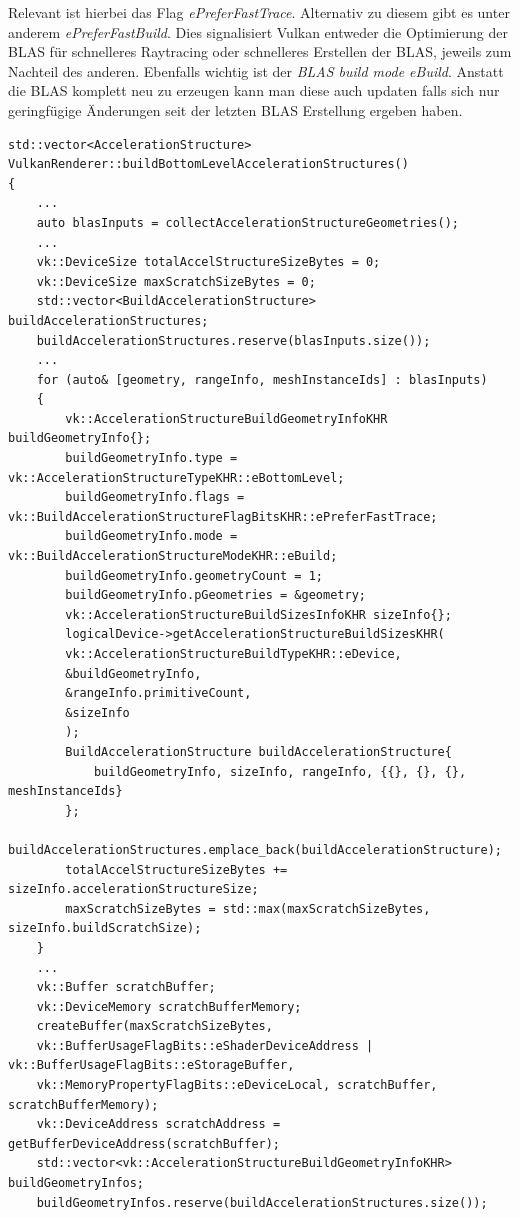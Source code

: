 \documentclass[11pt]{scrartcl}
\begin{document}
	Relevant ist hierbei das Flag \textit{ePreferFastTrace}. Alternativ zu diesem gibt es unter anderem \textit{ePreferFastBuild}. Dies signalisiert Vulkan entweder die Optimierung der BLAS für schnelleres Raytracing oder schnelleres Erstellen der BLAS, jeweils zum Nachteil des anderen. Ebenfalls wichtig ist der \textit{BLAS build mode eBuild}. Anstatt die BLAS komplett neu zu erzeugen kann man diese auch updaten falls sich nur geringfügige Änderungen seit der letzten BLAS Erstellung ergeben haben.
	
	\begin{lstlisting}[caption={Erzeugung der Bottom-Level Acceleration Structures in VulkanRenderer.cpp},label={lst:listing-vulkan-createblascpp}]
std::vector<AccelerationStructure> VulkanRenderer::buildBottomLevelAccelerationStructures()
{
	...
	auto blasInputs = collectAccelerationStructureGeometries();
	...
	vk::DeviceSize totalAccelStructureSizeBytes = 0;
	vk::DeviceSize maxScratchSizeBytes = 0;
	std::vector<BuildAccelerationStructure> buildAccelerationStructures;
	buildAccelerationStructures.reserve(blasInputs.size());
	...
	for (auto& [geometry, rangeInfo, meshInstanceIds] : blasInputs)
	{
		vk::AccelerationStructureBuildGeometryInfoKHR buildGeometryInfo{};
		buildGeometryInfo.type = vk::AccelerationStructureTypeKHR::eBottomLevel;
		buildGeometryInfo.flags = vk::BuildAccelerationStructureFlagBitsKHR::ePreferFastTrace;
		buildGeometryInfo.mode = vk::BuildAccelerationStructureModeKHR::eBuild;
		buildGeometryInfo.geometryCount = 1;
		buildGeometryInfo.pGeometries = &geometry;
		vk::AccelerationStructureBuildSizesInfoKHR sizeInfo{};
		logicalDevice->getAccelerationStructureBuildSizesKHR(
		vk::AccelerationStructureBuildTypeKHR::eDevice,
		&buildGeometryInfo,
		&rangeInfo.primitiveCount,
		&sizeInfo
		);
		BuildAccelerationStructure buildAccelerationStructure{
			buildGeometryInfo, sizeInfo, rangeInfo, {{}, {}, {}, meshInstanceIds}
		};
		buildAccelerationStructures.emplace_back(buildAccelerationStructure);
		totalAccelStructureSizeBytes += sizeInfo.accelerationStructureSize;
		maxScratchSizeBytes = std::max(maxScratchSizeBytes, sizeInfo.buildScratchSize);
	}
	...
	vk::Buffer scratchBuffer;
	vk::DeviceMemory scratchBufferMemory;
	createBuffer(maxScratchSizeBytes,
	vk::BufferUsageFlagBits::eShaderDeviceAddress | vk::BufferUsageFlagBits::eStorageBuffer,
	vk::MemoryPropertyFlagBits::eDeviceLocal, scratchBuffer, scratchBufferMemory);
	vk::DeviceAddress scratchAddress = getBufferDeviceAddress(scratchBuffer);
	std::vector<vk::AccelerationStructureBuildGeometryInfoKHR> buildGeometryInfos;
	buildGeometryInfos.reserve(buildAccelerationStructures.size());

\end{lstlisting}
\end{document}
